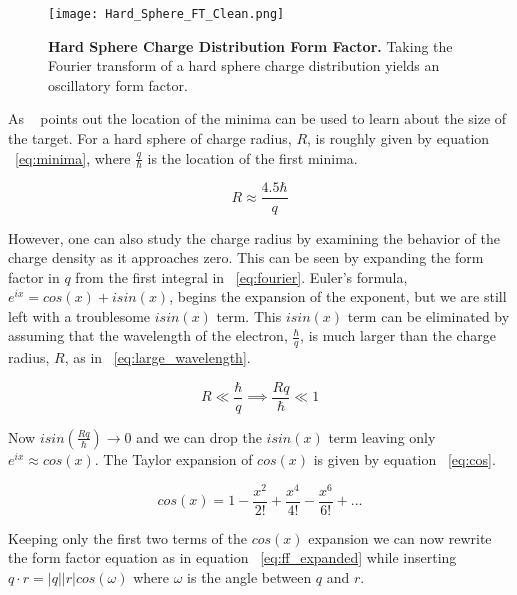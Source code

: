 \begin{figure}[!ht]
\begin{center}
\texttt{[image: Hard\_Sphere\_FT\_Clean.png]}
\end{center}
\caption{
{\bf{Hard Sphere Charge Distribution Form Factor.}} Taking the Fourier transform of a hard sphere charge distribution yields an oscillatory form factor.}
\label{fig:hard_sphere}
\end{figure}

As ~\cite{Book:Povh} points out the location of the minima can be used to learn about the size of the target. For a hard sphere of charge radius, $R$, is roughly given by equation ~\ref{eq:minima}, where $\frac{q}{\hbar}$ is the location of the first minima. 

\begin{equation} \label{eq:minima}
	R \approx \frac{4.5 \hbar}{q}
\end{equation}

\noindent However, one can also study the charge radius by examining the behavior of the charge density as it approaches zero. This can be seen by expanding the form factor in $q$ from the first integral in ~\ref{eq:fourier}. Euler's formula, $e^{ix} = cos(x)+isin(x)$, begins the expansion of the exponent, but we are still left with a troublesome $isin(x)$ term. This $isin(x)$ term can be eliminated by assuming that the wavelength of the electron, $\frac{\hbar}{q}$, is much larger than the charge radius, $R$, as in ~\ref{eq:large_wavelength}.

\begin{equation} \label{eq:large_wavelength}
	R \ll \frac{\hbar}{q} \implies \frac{Rq}{\hbar} \ll 1
\end{equation}

Now $isin\left(\frac{Rq}{\hbar}\right) \xrightarrow{} 0$ and we can drop the $isin(x)$ term leaving only $e^{ix} \approx cos(x)$. The Taylor expansion of $cos(x)$ is given by equation ~\ref{eq:cos}.

\begin{equation} \label{eq:cos}
	cos(x) = 1 - \frac{x^2}{2!} + \frac{x^4}{4!} - \frac{x^6}{6!} +...
\end{equation}

\noindent Keeping only the first two terms of the $cos(x)$ expansion we can now rewrite the form factor equation as in equation ~\ref{eq:ff_expanded} while inserting $q \cdot r = |q||r|cos(\omega)$ where $\omega$ is the angle between $q$ and $r$.

